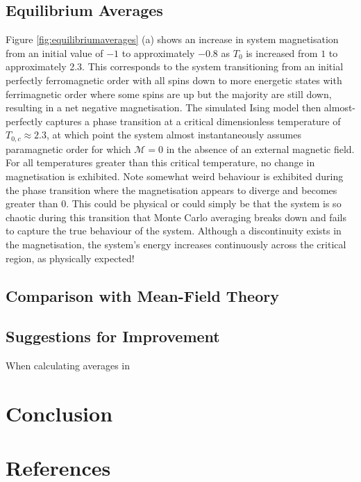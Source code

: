 \documentclass[11pt]{iopart}
\begin{document}
\subsection{Equilibrium Averages}
Figure \ref{fig:equilibriumaverages} (a) shows an increase in system magnetisation from an initial value of $-1$ to approximately $-0.8$ as $T_0$ is increased from $1$ to approximately 2.3. This corresponds to the system transitioning from an initial perfectly ferromagnetic order with all spins down to more energetic states with ferrimagnetic order where some spins are up but the majority are still down, resulting in a net negative magnetisation. The simulated Ising model then almost-perfectly captures a phase transition at a critical dimensionless temperature of $T_{0,c} \approx 2.3$, at which point the system almost instantaneously assumes paramagnetic order for which $\mathcal{M} = 0$ in the absence of an external magnetic field. For all temperatures greater than this critical temperature, no change in magnetisation is exhibited. Note somewhat weird behaviour is exhibited during the phase transition where the magnetisation appears to diverge and becomes greater than 0. This could be physical or could simply be that the system is so chaotic during this transition that Monte Carlo averaging breaks down and fails to capture the true behaviour of the system. Although a discontinuity exists in the magnetisation, the system's energy increases continuously across the critical region, as physically expected!

\subsection{Comparison with Mean-Field Theory}
 
 \subsection{Suggestions for Improvement}
 When calculating averages in 
 
\section{Conclusion}

\section*{References}


\end{document}

